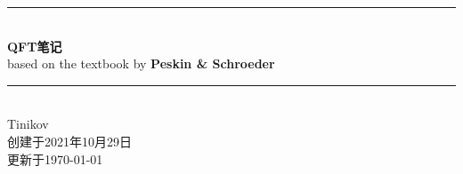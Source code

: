 \documentclass[10pt,b5paper, openany]{book} %
\newcommand{\HRule}{\rule{\linewidth}{0.5mm}}
\begin{document}
\pagestyle{fancy}

\begin{titlepage}
  \centering

  \HRule \\[0.7cm]

  {\bfseries \fontsize{35pt}{1pt}\selectfont {}QFT笔记} \\[0.3cm]

  {\fontsize{14pt}{1pt}\selectfont based on the textbook by {\bfseries Peskin \& Schroeder}} \\[0.4cm]

  \HRule \\[0.6cm]

  {\Large Tinikov} \\[0.2cm]

  {\small 创建于2021年10月29日} \\[-0.1cm]

  {\small 更新于\today} \\[0cm]

\end{titlepage}

\setcounter{page}{1}

\clearpage

{}
{
  \hypersetup{linkcolor=black}
  \tableofcontents
}
\clearpage
\end{document}

